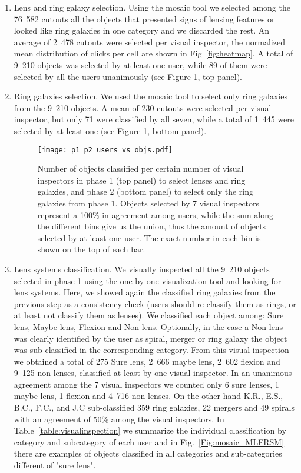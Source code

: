 \documentclass[tradiabstract,twocolumn]{aa}
\begin{document}
\begin{enumerate}
\item Lens and ring galaxy selection. Using the mosaic tool we selected among the 76~582 cutouts all the objects that presented signs of lensing features or looked like ring galaxies in one category and we discarded the rest. An average of 2~478 cutouts were selected per visual inspector, the normalized mean distribution of clicks per cell are shown in Fig~\ref{fig:heatmap}. A total of 9~210 objects was selected by at least one user, while 89 of them were selected by all the users unanimously (see Figure \ref{Fig:vi_phase1and2}, top panel). 

\item Ring galaxies selection. We used the mosaic tool to select only ring galaxies from the 9~210 objects. A mean of 230 cutouts were selected per visual inspector, but only 71 were classified by all seven, while a total of 1~445 were selected by at least one (see Figure \ref{Fig:vi_phase1and2}, bottom panel).

\begin{figure}
\centering
\texttt{[image: p1\_p2\_users\_vs\_objs.pdf]}
\caption{Number of objects classified per certain number of visual inspectors in phase 1 (top panel) to select lenses and ring galaxies, and phase 2 (bottom panel) to select only the ring galaxies from phase 1. Objects selected by 7 visual inspectors represent a 100$\%$ in agreement among users, while the sum along the different bins give us the union, thus the amount of objects selected by at least one user. The exact number in each bin is shown on the top of each bar.}
\label{Fig:vi_phase1and2}
\end{figure}

\item Lens systems classification. We visually inspected all the 9~210 objects selected in phase 1 using the one by one visualization tool and looking for lens systems. Here, we showed again the classified ring galaxies from the previous step as a consistency check (users should re-classify them as rings, or at least not classify them as lenses). We classified each object among: Sure lens, Maybe lens, Flexion and Non-lens. Optionally, in the case a Non-lens was clearly identified by the user as spiral, merger or ring galaxy the object was sub-classified in the corresponding category. From this visual inspection we obtained a total of 275 Sure lens, 2~666 maybe lens, 2~602 flexion and 9~125 non lenses, classified at least by one visual inspector. In an unanimous agreement among the 7 visual inspectors we counted only 6 sure lenses, 1 maybe lens, 1 flexion and 4~716 non lenses. On the other hand K.R., E.S., B.C., F.C., and J.C sub-classified 359 ring galaxies, 22 mergers and 49 spirals with an agreement of 50\% among the visual inspectors. In Table~\ref{table:visualinspection} we summarize the individual classification by category and subcategory of each user and in Fig.~\ref{Fig:mosaic_MLFRSM} there are examples of objects classified in all categories and sub-categories different of "sure lens".



\end{enumerate}
\end{document}
